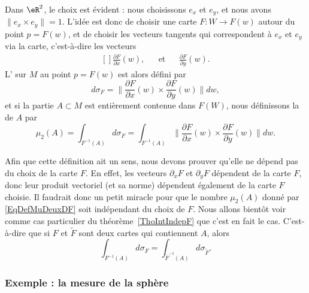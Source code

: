 Dans $\eR^2$, le choix est évident : nous choisissons $e_x$ et $e_y$, et nous avons $\|e_x\times e_y\|=1$. L'idée est donc de choisir une carte $F\colon W\to F(w)$ autour du point $p=F(w)$, et de choisir les vecteurs tangents qui correspondent à $e_x$ et $e_y$ via la carte, c'est-à-dire les vecteurs
\begin{equation}
	\begin{aligned}[]
		\frac{ \partial F }{ \partial x }(w),&&\text{et}&&\frac{ \partial F }{ \partial y }(w).
	\end{aligned}
\end{equation}
L' sur $M$ au point $p=F(w)$ est alors défini par
\begin{equation}
	d\sigma_F=\|  \frac{ \partial F }{ \partial x }(w)\times\frac{ \partial F }{ \partial y }(w) \|dw,
\end{equation}
et si la partie $A\subset M$ est entièrement contenue dans $F(W)$, nous définissons la  de $A$ par
\begin{equation}		\label{EqDefMuDeuxDF}
	\mu_2(A)=\int_{F^{-1}(A)}d\sigma_F=\int_{F^{-1}(A)}\| \frac{ \partial F }{ \partial x }(w)\times\frac{ \partial F }{ \partial y }(w) \|dw.
\end{equation}
\begin{remark}
	Afin que cette définition ait un sens, nous devons prouver qu'elle ne dépend pas du choix de la carte $F$. En effet, les vecteurs $\partial_xF$ et $\partial_yF$ dépendent de la carte $F$, donc leur produit vectoriel (et sa norme) dépendent également de la carte $F$ choisie. Il faudrait donc un petit miracle pour que le nombre $\mu_2(A)$ donné par \eqref{EqDefMuDeuxDF} soit indépendant du choix de $F$.  Nous allons bientôt voir comme cas particulier du théorème~\ref{ThoIntIndepF} que c'est en fait le cas. C'est-à-dire que si $F$ et $\tilde F$ sont deux cartes qui contiennent $A$, alors
	\begin{equation}
		\int_{F^{-1}(A)}d\sigma_F=\int_{\tilde F^{-1}(A)}d\sigma_{\tilde F}.
	\end{equation}
\end{remark}

\subsubsection{Exemple : la mesure de la sphère}

